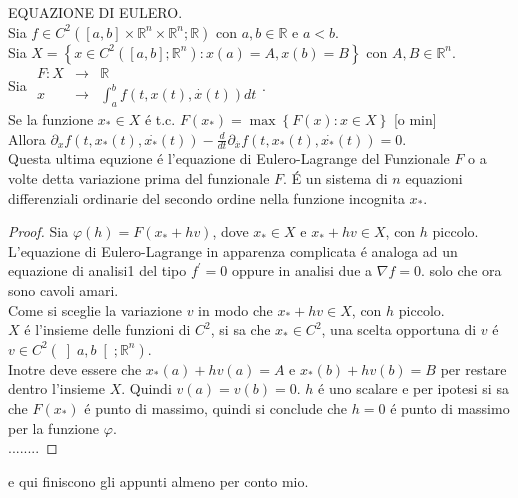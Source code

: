 \theorem EQUAZIONE DI EULERO.\\
Sia $f\in C^2\left(\left[a,b\right]\times\mathbb{R}^n\times\mathbb{R}^n;\mathbb{R}\right)$ con $a,b\in\mathbb{R}$ e $a<b$.\\
Sia $X=\left\{x\in C^2\left(\left[a,b\right];\mathbb{R}^n\right): x(a)=A, x(b)=B\right\}$ con $A,B\in\mathbb{R}^n$.\\
Sia $\begin{array}{ccc} F: X & \to & \mathbb{R} \\
x & \to & \int_{a}^b f(t,x(t),\overset{\cdot}{x}(t))dt\end{array}$.\\
Se la funzione $x_\ast\in X$ \'e t.c. $F(x_\ast)=\max\left\{F(x):x\in X \right\}$ [o min]\\
Allora $\partial_xf(t,x_\ast(t),\overset{\cdot}{x_\ast}(t))-\frac{d}{dt}\partial_{\overset{\cdot}{x}}f(t,x_\ast(t),\overset{\cdot}{x_\ast}(t))=0$.\\
Questa ultima equzione \'e l'equazione di Eulero-Lagrange del Funzionale $F$ o a volte detta variazione prima del funzionale $F$. \'E un sistema di $n$ equazioni differenziali ordinarie del secondo ordine nella funzione incognita $x_\ast$.
\begin{proof}
	 Sia $\varphi(h)=F(x_\ast+hv)$, dove $x_\ast\in X$ e $x_\ast+hv\in X$, con $h$ piccolo.\\
	 L'equazione di Eulero-Lagrange in apparenza complicata \'e analoga ad un equazione di analisi1 del tipo $f^{'}=0$ oppure in analisi due a $\nabla f=0$. solo che ora sono cavoli amari.\\
	 Come si sceglie la variazione $v$ in modo che $x_\ast+hv\in X$, con $h$ piccolo.\\
	 $X$ \'e l'insieme delle funzioni di $C^2$, si sa che $x_\ast\in C^2$, una scelta opportuna di $v$ \'e $v\in C^2(\left]a,b\right[;\mathbb{R}^n)$.\\
	 Inotre deve essere che $ x_\ast(a)+hv(a)=A$ e  $x_\ast(b)+hv(b)=B$ per restare dentro l'insieme $X$.
	 Quindi $v(a)=v(b)=0$.
	 $h$ \'e uno scalare e per ipotesi si sa che $F(x_\ast)$ \'e punto di massimo, quindi si conclude che $h=0$ \'e punto di massimo per la funzione $\varphi$.\\
	 ........ 
\end{proof}
e qui finiscono gli appunti almeno per conto mio.


